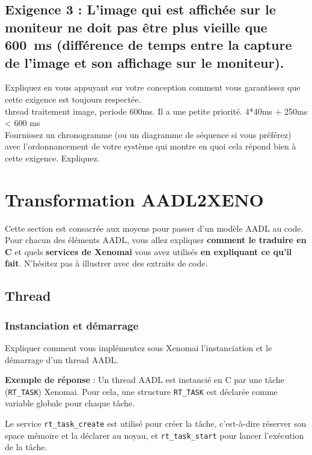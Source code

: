 \documentclass[11pt, a4paper]{paper}
\begin{document}
\subsection{Exigence 3 : 
L'image qui est  affichée sur le moniteur ne doit pas être plus vieille que 600~ms (différence de temps entre la capture de l'image et son affichage sur le moniteur).}

{\color{blue} Expliquez en vous appuyant sur votre conception comment vous garantissez que cette exigence est toujours respectée. \\}
{\color{black} thread traitement image, periode 600ms. Il a une petite priorité. 4*40ms + 250ms < 600 ms \\}
{\color{blue} Fournissez un chronogramme (ou un diagramme de séquence si vous préférez) avec l’ordonnancement de votre système qui montre en quoi cela répond bien à cette exigence. Expliquez.}


\section{Transformation AADL2XENO}
 
 {\color{red} Cette section est consacrée aux moyens pour passer d'un modèle AADL au code. Pour chacun des éléments AADL, vous allez expliquer {\bf comment le traduire en C} et quels {\bf services de Xenomai} vous avez utilisés {\bf en expliquant ce qu'il fait}. N'hésitez pas à illustrer avec des extraits de code.}
 
\subsection{Thread}
\subsubsection{Instanciation et démarrage}
 {\color{blue} Expliquer comment vous implémentez sous Xenomai l'instanciation et le démarrage d'un  thread AADL.}
 
{\color{blue} {\bf Exemple de réponse} : Un thread AADL est instancié en C par une tâche ({\tt RT\_TASK}) Xenomai.  Pour cela, une structure {\tt RT\_TASK} est déclarée comme variable globale pour chaque tâche.

Le service {\tt rt\_task\_create} est utilisé pour créer la tâche, c'est-à-dire réserver son space mémoire et la déclarer au noyau, et {\tt rt\_task\_start} pour lancer l'exécution de la tâche.}
\end{document}
